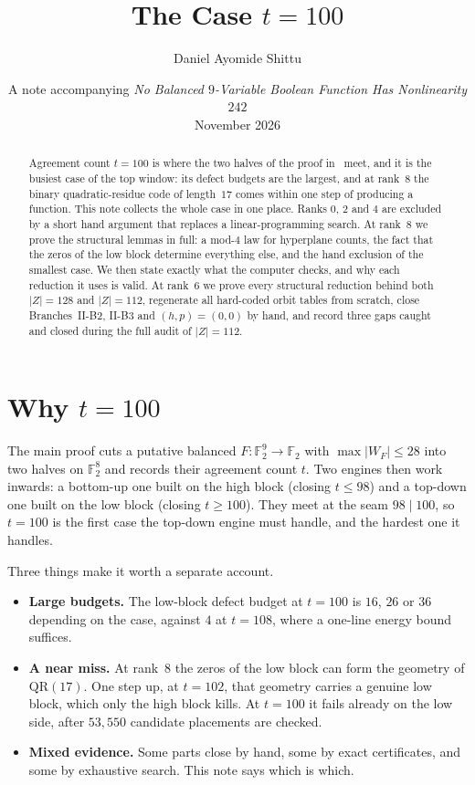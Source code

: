\documentclass[11pt]{article}
\title{The Case $t=100$}
\author{Daniel Ayomide Shittu}
\date{A note accompanying \emph{No Balanced $9$-Variable Boolean Function Has Nonlinearity $242$}\\[2pt] November 2026}
\theoremstyle{definition}
\theoremstyle{remark}
\newcommand{\F}{\mathbb{F}}
\DeclareRobustCommand{\_}{\textunderscore\allowbreak}
\newcommand{\main}{\cite{Main}}
\begin{document}
\maketitle

\begin{abstract}
Agreement count $t=100$ is where the two halves of the proof in~\main{} meet, and it is the busiest case of the top window: its defect budgets are the largest, and at rank~$8$ the binary quadratic-residue code of length~$17$ comes within one step of producing a function. This note collects the whole case in one place. Ranks $0$, $2$ and $4$ are excluded by a short hand argument that replaces a linear-programming search. At rank~$8$ we prove the structural lemmas in full: a mod-$4$ law for hyperplane counts, the fact that the zeros of the low block determine everything else, and the hand exclusion of the smallest case. We then state exactly what the computer checks, and why each reduction it uses is valid. At rank~$6$ we prove every structural reduction behind both $|Z|=128$ and $|Z|=112$, regenerate all hard-coded orbit tables from scratch, close Branches~II-B2, II-B3 and $(h,p)=(0,0)$ by hand, and record three gaps caught and closed during the full audit of $|Z|=112$.
\end{abstract}

\tableofcontents

\section{Why $t=100$}

The main proof cuts a putative balanced $F:\F_2^9\to\F_2$ with $\max|W_F|\le28$ into two halves on $\F_2^8$ and records their agreement count $t$. Two engines then work inwards: a bottom-up one built on the high block (closing $t\le98$) and a top-down one built on the low block (closing $t\ge100$). They meet at the seam $98\mid100$, so $t=100$ is the first case the top-down engine must handle, and the hardest one it handles.

Three things make it worth a separate account.
\begin{itemize}[nosep]
\item \textbf{Large budgets.} The low-block defect budget at $t=100$ is $16$, $26$ or $36$ depending on the case, against $4$ at $t=108$, where a one-line energy bound suffices.
\item \textbf{A near miss.} At rank~$8$ the zeros of the low block can form the geometry of $\mathrm{QR}(17)$. One step up, at $t=102$, that geometry carries a genuine low block, which only the high block kills. At $t=100$ it fails already on the low side, after $53{,}550$ candidate placements are checked.
\item \textbf{Mixed evidence.} Some parts close by hand, some by exact certificates, and some by exhaustive search. This note says which is which.
\end{itemize}
\end{document}
